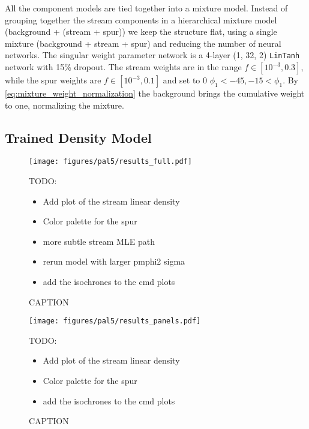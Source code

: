 \documentclass[twocolumn]{aastex631}
\begin{document}
        All the component models are tied together into a mixture model.
        Instead of grouping together the stream components in a hierarchical
        mixture model (background + (stream + spur)) we keep the structure flat,
        using a single mixture (background + stream + spur) and reducing the number
        of neural networks. The singular weight parameter network is a 4-layer (1, 32, 2) \texttt{LinTanh} network with 15\% dropout.
        The stream weights are in the range $f \in [10^{-3}, 0.3]$, while 
        the spur weights are $f \in [10^{-3}, 0.1]$ and set to 0 $\phi_1 < -45, -15 < \phi_1$. By \autoref{eq:mixture_weight_normalization} the background  brings the cumulative weight to one, normalizing the mixture.


    \subsection{Trained Density Model} \label{sub:results_pal5:results}

        \begin{figure*}[h]
            \centering
            \texttt{[image: figures/pal5/results\_full.pdf]}
            \caption{CAPTION}
            \label{fig:pal5-results-full}
            TODO:
            \begin{itemize}
                \item Add plot of the stream linear density
                \item Color palette for the spur
                \item more subtle stream MLE path
                \item rerun model with larger pmphi2 sigma
                \item add the isochrones to the cmd plots
            \end{itemize}
        \end{figure*}

        \begin{figure*}[h]
            \centering
            \texttt{[image: figures/pal5/results\_panels.pdf]}
            \caption{CAPTION}
            TODO:
            \begin{itemize}
                \item Add plot of the stream linear density
                \item Color palette for the spur
                \item add the isochrones to the cmd plots
            \end{itemize}
            \label{fig:pal5-results-panels}
        \end{figure*}
\end{document}
